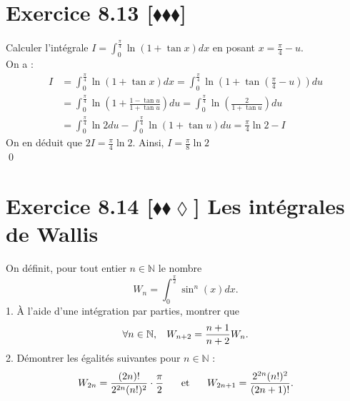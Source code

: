 \documentclass[10pt]{article}
\begin{document}

\section*{Exercice 8.13 [$\blacklozenge\blacklozenge\blacklozenge$]}
\begin{tcolorbox}[enhanced, width=7in, center, size=fbox, fontupper=\large, drop shadow southwest]
    Calculer l'intégrale $I = \int_0^{\frac{\pi}{4}}{\ln(1+\tan x)dx}$ en posant $x=\frac{\pi}{4}-u$.\\
    On a :
    \begin{align*}
        I &= \int_0^{\frac{\pi}{4}}{\ln(1+\tan x)dx} = \int_{0}^{\frac{\pi}{4}}{\ln\left(1+\tan\left(\frac{\pi}{4}-u\right)\right)du}\\
        &=\int^{\frac{\pi}{4}}_0{\ln\left(1+\frac{1-\tan u}{1+\tan u}\right)du}=\int_0^{\frac{\pi}{4}}{\ln\left(\frac{2}{1+\tan u}\right)du}\\
        &=\int_0^{\frac{\pi}{4}}{\ln2du}-\int_0^{\frac{\pi}{4}}{\ln(1+\tan u)du} = \frac{\pi}{4}\ln2 - I
    \end{align*}
    On en déduit que $2I = \frac{\pi}{4}\ln2$. Ainsi, $I=\frac{\pi}{8}\ln2$\\
    \qed
\end{tcolorbox}


\section*{Exercice 8.14 [$\blacklozenge\blacklozenge\lozenge$] Les intégrales de Wallis}
\begin{tcolorbox}[enhanced, width=7in, center, size=fbox, fontupper=\large, drop shadow southwest]
    On définit, pour tout entier $n\in\mathbb{N}$ le nombre
    \begin{equation*}
        W_n = \int_0^{\frac{\pi}{2}}{\sin^n(x)dx}.
    \end{equation*}
    1. À l'aide d'une intégration par parties, montrer que
    \begin{equation*}
        \forall{n\in\mathbb{N}}, \hspace{0.3cm} W_{n+2} = \frac{n+1}{n+2}W_n.
    \end{equation*}
    2. Démontrer les égalités suivantes pour $n\in\mathbb{N}$ :
    \begin{equation*}
        W_{2n}=\frac{(2n)!}{2^{2n}(n!)^2}\cdot\frac{\pi}{2} \hspace{0.5cm} \text{ et } \hspace{0.5cm} W_{2n+1}=\frac{2^{2n}(n!)^2}{(2n+1)!}.
    \end{equation*}
\end{tcolorbox}
\end{document}
